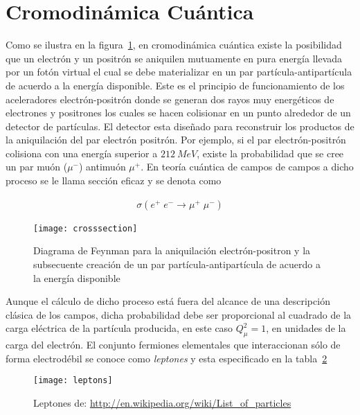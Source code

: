 \section{Cromodinámica Cuántica}
\label{sec:inter-fuert}

Como se ilustra en la figura~\ref{fig:crosssection}, en cromodinámica cuántica existe la posibilidad que un electrón y un positrón se aniquilen mutuamente en pura energía llevada por un fotón virtual el cual se debe materializar en un par partícula-antipartícula de acuerdo a la energía disponible. Este es el principio de funcionamiento de los aceleradores electrón-positrón donde se generan dos rayos muy energéticos de electrones y positrones los cuales se hacen colisionar en un punto alrededor de un detector de partículas. El detector esta diseñado para reconstruir los productos de la aniquilación del par electrón positrón. Por ejemplo, si el par electrón-positrón colisiona con una energía superior a $\SI{212}{MeV}$, existe la probabilidad que se cree un par muón ($\mu^-$) antimuón $\mu^{+}$. En teoría cuántica de campos de campos a dicho proceso se le llama sección eficaz y se denota como
\begin{frame}
\begin{align}
  \sigma(e^+\;e^-\rightarrow \mu^+\;\mu^-)
\end{align}

\begin{figure}
  \centering
  \texttt{[image: crosssection]}
  \caption{Diagrama de Feynman para la aniquilación electrón-positron y la subsecuente creación de un par partícula-antipartícula de acuerdo a la energía disponible}
  \label{fig:crosssection}
\end{figure}
\end{frame}
Aunque el cálculo de dicho proceso está fuera del alcance de una descripción clásica de los campos, dicha probabilidad debe ser proporcional al cuadrado de la carga eléctrica de la partícula producida, en este caso $Q_{\mu}^2=1$, en unidades de la carga del electrón. El conjunto fermiones elementales que interaccionan sólo de forma electrodébil se conoce como \emph{leptones} y esta especificado en la tabla~\ref{tab:leptons}
\begin{frame}
\begin{figure}
  \centering
  \texttt{[image: leptons]}
  \caption{Leptones de: \url{http://en.wikipedia.org/wiki/List_of_particles}}
  \label{tab:leptons}
\end{figure}
\end{frame}

